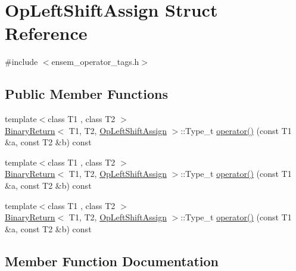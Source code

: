 \hypertarget{structOpLeftShiftAssign}{}\section{Op\+Left\+Shift\+Assign Struct Reference}
\label{structOpLeftShiftAssign}


{\ttfamily \#include $<$ensem\+\_\+operator\+\_\+tags.\+h$>$}

\subsection*{Public Member Functions}
\begin{DoxyCompactItemize}
\item 
{\footnotesize template$<$class T1 , class T2 $>$ }\\\mbox{\hyperlink{structBinaryReturn}{Binary\+Return}}$<$ T1, T2, \mbox{\hyperlink{structOpLeftShiftAssign}{Op\+Left\+Shift\+Assign}} $>$\+::Type\+\_\+t \mbox{\hyperlink{structOpLeftShiftAssign_a1606d84ca8d3445b33cbf098a7c3667e}{operator()}} (const T1 \&a, const T2 \&b) const
\item 
{\footnotesize template$<$class T1 , class T2 $>$ }\\\mbox{\hyperlink{structBinaryReturn}{Binary\+Return}}$<$ T1, T2, \mbox{\hyperlink{structOpLeftShiftAssign}{Op\+Left\+Shift\+Assign}} $>$\+::Type\+\_\+t \mbox{\hyperlink{structOpLeftShiftAssign_a1606d84ca8d3445b33cbf098a7c3667e}{operator()}} (const T1 \&a, const T2 \&b) const
\item 
{\footnotesize template$<$class T1 , class T2 $>$ }\\\mbox{\hyperlink{structBinaryReturn}{Binary\+Return}}$<$ T1, T2, \mbox{\hyperlink{structOpLeftShiftAssign}{Op\+Left\+Shift\+Assign}} $>$\+::Type\+\_\+t \mbox{\hyperlink{structOpLeftShiftAssign_a1606d84ca8d3445b33cbf098a7c3667e}{operator()}} (const T1 \&a, const T2 \&b) const
\end{DoxyCompactItemize}


\subsection{Member Function Documentation}
\mbox{\label{structOpLeftShiftAssign_a1606d84ca8d3445b33cbf098a7c3667e}} 
